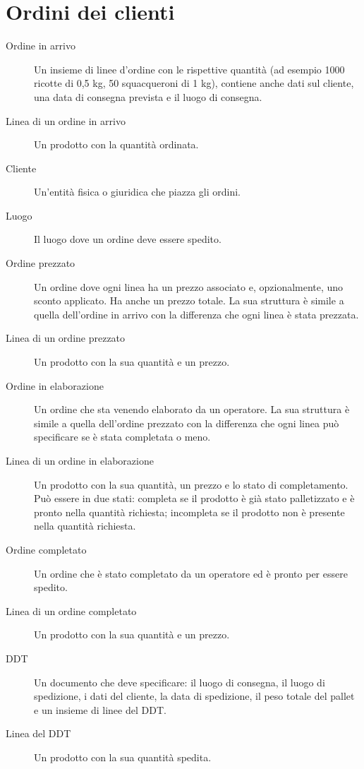 \section{Ordini dei clienti}
\begin{description}
    \item[Ordine in arrivo]
    Un insieme di linee d'ordine con le rispettive quantità (ad esempio 1000 ricotte di 0,5 kg, 50 squacqueroni di 1 kg), contiene anche dati sul cliente, una data di consegna prevista e il luogo di consegna.
    \item[Linea di un ordine in arrivo] Un prodotto con la quantità ordinata.
    \item[Cliente] Un'entità fisica o giuridica che piazza gli ordini.
    \item[Luogo] Il luogo dove un ordine deve essere spedito.
    \item[Ordine prezzato] Un ordine dove ogni linea ha un prezzo associato e, opzionalmente, uno sconto applicato. Ha anche un prezzo totale. La sua struttura è simile a quella dell'ordine in arrivo con la differenza che ogni linea è stata prezzata.
    \item[Linea di un ordine prezzato] Un prodotto con la sua quantità e un prezzo.
    \item[Ordine in elaborazione] Un ordine che sta venendo elaborato da un operatore. La sua struttura è simile a quella dell'ordine prezzato con la differenza che ogni linea può specificare se è stata completata o meno.
    \item[Linea di un ordine in elaborazione] Un prodotto con la sua quantità, un prezzo e lo stato di completamento. Può essere in due stati: completa se il prodotto è già stato palletizzato e è pronto nella quantità richiesta; incompleta se il prodotto non è presente nella quantità richiesta.
    \item[Ordine completato] Un ordine che è stato completato da un operatore ed è pronto per essere spedito.
    \item[Linea di un ordine completato] Un prodotto con la sua quantità e un prezzo.
    \item[DDT] Un documento che deve specificare: il luogo di consegna, il luogo di spedizione, i dati del cliente, la data di spedizione, il peso totale del pallet e un insieme di linee del DDT.
    \item[Linea del DDT] Un prodotto con la sua quantità spedita.
\end{description}

